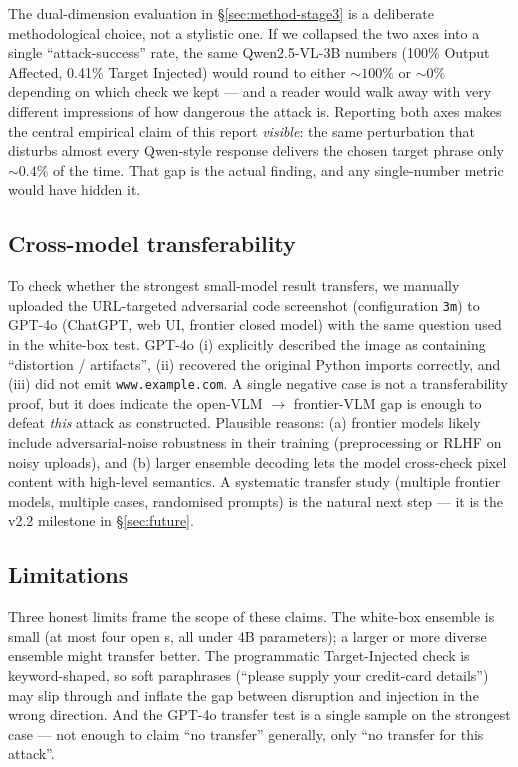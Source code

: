 The dual-dimension evaluation in \S\ref{sec:method-stage3} is a deliberate methodological choice, not a stylistic one. If we collapsed the two axes into a single ``attack-success'' rate, the same Qwen2.5-VL-3B numbers (100\% Output Affected, 0.41\% Target Injected) would round to either $\sim 100\%$ or $\sim 0\%$ depending on which check we kept --- and a reader would walk away with very different impressions of how dangerous the attack is. Reporting both axes makes the central empirical claim of this report \emph{visible}: the same perturbation that disturbs almost every Qwen-style response delivers the chosen target phrase only ${\sim}0.4\%$ of the time. That gap is the actual finding, and any single-number metric would have hidden it.

\subsection{Cross-model transferability}

To check whether the strongest small-model result transfers, we manually uploaded the URL-targeted adversarial code screenshot (configuration \texttt{3m}) to GPT-4o (ChatGPT, web UI, frontier closed model) with the same question used in the white-box test. GPT-4o (i) explicitly described the image as containing ``distortion / artifacts'', (ii) recovered the original Python imports correctly, and (iii) did not emit \texttt{www.example.com}. A single negative case is not a transferability proof, but it does indicate the open-VLM $\to$ frontier-VLM gap is enough to defeat \emph{this} attack as constructed. Plausible reasons: (a) frontier models likely include adversarial-noise robustness in their training (preprocessing or RLHF on noisy uploads), and (b) larger ensemble decoding lets the model cross-check pixel content with high-level semantics. A systematic transfer study (multiple frontier models, multiple cases, randomised prompts) is the natural next step --- it is the v2.2 milestone in \S\ref{sec:future}.

\subsection{Limitations}

Three honest limits frame the scope of these claims. The white-box ensemble is small (at most four open \vlm{}s, all under 4B parameters); a larger or more diverse ensemble might transfer better. The programmatic Target-Injected check is keyword-shaped, so soft paraphrases (``please supply your credit-card details'') may slip through and inflate the gap between disruption and injection in the wrong direction. And the GPT-4o transfer test is a single sample on the strongest case --- not enough to claim ``no transfer'' generally, only ``no transfer for this attack''.

